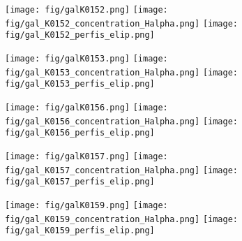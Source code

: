 \begin{figure}[!ht]
\begin{center}
\setcaptionmargin{1cm}
\texttt{[image: fig/galK0152.png]}
\texttt{[image: fig/gal\_K0152\_concentration\_Halpha.png]}
\texttt{[image: fig/gal\_K0152\_perfis\_elip.png]}
\end{center}
\end{figure}


\begin{figure}[!ht]
\begin{center}
\setcaptionmargin{1cm}
\texttt{[image: fig/galK0153.png]}
\texttt{[image: fig/gal\_K0153\_concentration\_Halpha.png]}
\texttt{[image: fig/gal\_K0153\_perfis\_elip.png]}
\end{center}
\end{figure}


\begin{figure}[!ht]
\begin{center}
\setcaptionmargin{1cm}
\texttt{[image: fig/galK0156.png]}
\texttt{[image: fig/gal\_K0156\_concentration\_Halpha.png]}
\texttt{[image: fig/gal\_K0156\_perfis\_elip.png]}
\end{center}
\end{figure}


\begin{figure}[!ht]
\begin{center}
\setcaptionmargin{1cm}
\texttt{[image: fig/galK0157.png]}
\texttt{[image: fig/gal\_K0157\_concentration\_Halpha.png]}
\texttt{[image: fig/gal\_K0157\_perfis\_elip.png]}
\end{center}
\end{figure}


\begin{figure}[!ht]
\begin{center}
\setcaptionmargin{1cm}
\texttt{[image: fig/galK0159.png]}
\texttt{[image: fig/gal\_K0159\_concentration\_Halpha.png]}
\texttt{[image: fig/gal\_K0159\_perfis\_elip.png]}
\end{center}
\end{figure}


